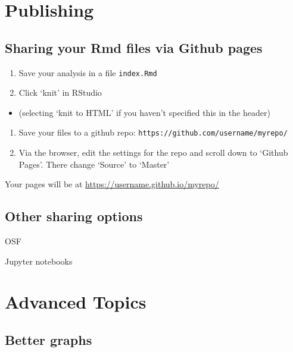 \documentclass[]{book}
\providecommand{\tightlist}{%
  \setlength{\itemsep}{0pt}\setlength{\parskip}{0pt}}
\begin{document}
\chapter{Publishing}\label{publishing}

\section{Sharing your Rmd files via Github
pages}\label{sharing-your-rmd-files-via-github-pages}

\begin{enumerate}
\def\labelenumi{\arabic{enumi}.}
\item
  Save your analysis in a file \texttt{index.Rmd}
\item
  Click `knit' in RStudio
\end{enumerate}

\begin{itemize}
\tightlist
\item
  (selecting `knit to HTML' if you haven't specified this in the header)
\end{itemize}

\begin{enumerate}
\def\labelenumi{\arabic{enumi}.}
\setcounter{enumi}{2}
\item
  Save your files to a github repo:
  \texttt{https://github.com/username/myrepo/}
\item
  Via the browser, edit the settings for the repo and scroll down to
  `Github Pages'. There change `Source' to `Master'
\end{enumerate}

Your pages will be at \url{https://username.github.io/myrepo/}

\section{Other sharing options}\label{other-sharing-options}

OSF

Jupyter notebooks

\chapter{Advanced Topics}\label{advanced-topics}

\section{Better graphs}\label{better-graphs}
\end{document}

